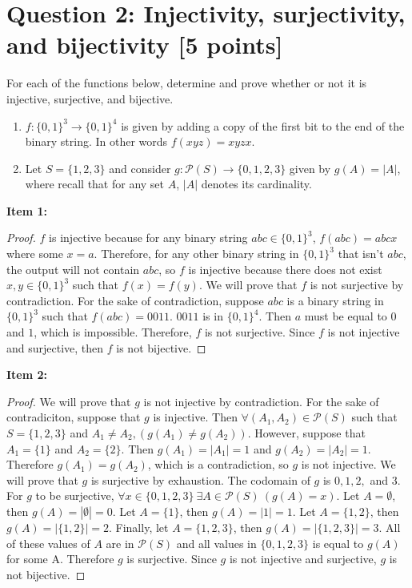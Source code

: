 \documentclass{report}
\theoremstyle{mytheoremstyle}
\theoremstyle{mytheoremstyle}
\theoremstyle{myproblemstyle}
\begin{document}
\section*{\Large{Question 2: Injectivity, surjectivity, and bijectivity [5 points]}}
For each of the functions below, determine and prove whether or not it is injective, surjective, and bijective.
\begin{enumerate}
    \item $f:\{0,1\}^3 \rightarrow \{0, 1\}^4$ is given by adding a copy of the first bit to the end of the binary string. In other words $f(xyz) = xyzx$.
    \item Let $S = \{1, 2, 3\}$ and consider $g: \mathcal{P}(S) \rightarrow \{0, 1, 2, 3\}$ given by $g(A) = |A|$, where recall that for any set $A$, $|A|$ denotes its cardinality.
\end{enumerate}
\textbf{Item 1:}
\begin{proof}
    $f$ is injective because for any binary string $abc \in \{0, 1\}^3$, $f(abc) = abcx$ where some $x = a$. Therefore, for any other binary string in $\{0, 1\}^3$ that isn't $abc$, the output will not contain $abc$, so $f$ is injective because there does not exist $x,y \in \{0,1\}^3$ such that $f(x) = f(y)$. We will prove that $f$ is not surjective by contradiction. For the sake of contradiction, suppose $abc$ is a binary string in $\{0, 1\}^3$ such that $f(abc) = 0011$. $0011$ is in $\{0, 1\}^4$. Then $a$ must be equal to $0$ and $1$, which is impossible. Therefore, $f$ is not surjective. Since $f$ is not injective and surjective, then $f$ is not bijective.
\end{proof} 
\textbf{Item 2:}
\begin{proof}
    We will prove that $g$ is not injective by contradiction. For the sake of contradiciton, suppose that $g$ is injective. Then $\forall (A_1, A_2) \in \mathcal{P}(S)$ such that $S = \{1, 2, 3\}$ and $A_1 \neq A_2, (g(A_1) \neq g(A_2))$. However, suppose that $A_1 = \{1\}$ and $A_2 = \{2\}$. Then $g(A_1) = |A_1| = 1$ and $g(A_2) = |A_2| = 1$. Therefore $g(A_1) = g(A_2)$, which is a contradiction, so $g$ is not injective. We will prove that $g$ is surjective by exhaustion. The codomain of $g$ is $0, 1, 2,$ and $3$. For $g$ to be surjective, $\forall x \in \{0, 1, 2, 3\} \: \exists A \in \mathcal{P}(S) \: (g(A)=x)$. Let $A = \emptyset$, then $g(A) = |\emptyset| = 0$. Let $A = \{1\}$, then $g(A) = |{1}| = 1$. Let $A = \{1, 2\}$, then $g(A) = |\{1, 2\}| = 2.$ Finally, let $A = \{1, 2, 3\}$, then $g(A) = |\{1, 2, 3\}| = 3.$ All of these values of $A$ are in $\mathcal{P}(S)$ and all values in $\{0, 1, 2, 3\}$ is equal to $g(A)$ for some A. Therefore $g$ is surjective. Since $g$ is not injective and surjective, $g$ is not bijective.  
\end{proof}
\end{document}
